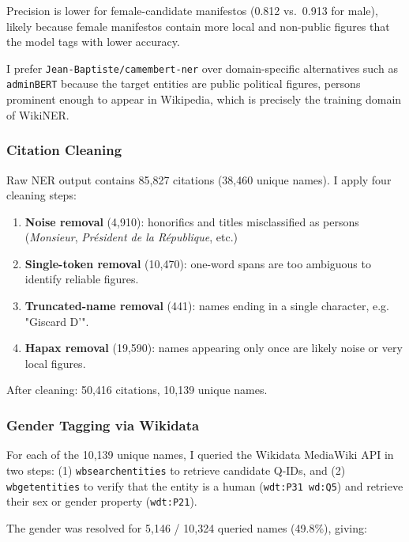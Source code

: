 \documentclass{article}
\begin{document}
Precision is lower for female-candidate manifestos (0.812 vs.\ 0.913 for male), likely because female manifestos contain more local and non-public figures that the model tags with lower accuracy.

I prefer \texttt{Jean-Baptiste/camembert-ner} over domain-specific alternatives such as \texttt{adminBERT} because the target entities are public political figures, persons prominent enough to appear in Wikipedia, which is precisely the training domain of WikiNER.

\subsubsection{Citation Cleaning}

Raw NER output contains 85,827 citations (38,460 unique names). I apply four cleaning steps:

\begin{enumerate}
  \item \textbf{Noise removal} (4,910): honorifics and titles misclassified as persons (\emph{Monsieur}, \emph{Président de la République}, etc.)
  \item \textbf{Single-token removal} (10,470): one-word spans are too ambiguous to identify reliable figures.
  \item \textbf{Truncated-name removal} (441): names ending in a single character, e.g. "Giscard D'".
  \item \textbf{Hapax removal} (19,590): names appearing only once are likely noise or very local figures.
\end{enumerate}

After cleaning: 50,416 citations, 10,139 unique names.

\subsubsection{Gender Tagging via Wikidata} %

For each of the 10,139 unique names, I queried the Wikidata MediaWiki API in two steps: (1) \texttt{wbsearchentities} to retrieve candidate Q-IDs, and (2) \texttt{wbgetentities} to verify that the entity is a human (\texttt{wdt:P31 wd:Q5}) and retrieve their sex or gender property (\texttt{wdt:P21}).

The gender was resolved for 5,146 / 10,324 queried names (49.8\%), giving:

  \begin{table}[h]                        
      \centering
      \small                                                                      
      
      \label{tab:gender_dist}                                                     
      \caption{Gender distribution of citations after Wikidata resolution. }                                                             
  \end{table}
\end{document}
